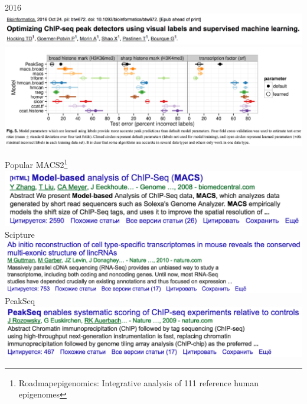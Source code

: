 \documentclass{beamer}
\begin{document}
\begin{frame}
2016\\
\includegraphics[width=\linewidth]{papervisualchipseq.png}\\
\includegraphics[width=\linewidth]{visualchipseq.png}\\
\end{frame}

\begin{frame}{Popular}
MACS2\footnote{Roadmapepigenomics: Integrative analysis of 111 reference human epigenomes}\\
\includegraphics[width=\linewidth]{MACS2.png}\\
Scipture\\
\includegraphics[width=\linewidth]{scripture.png}\\
PeakSeq\\
\includegraphics[width=\linewidth]{peakseq.png}\\
\end{frame}
\end{document}
